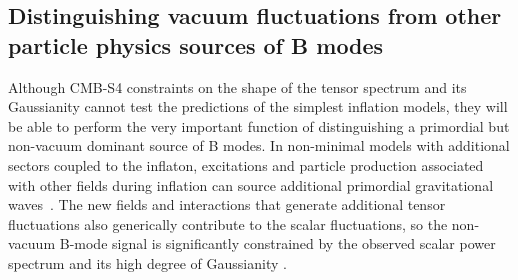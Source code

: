 \subsection{Distinguishing vacuum fluctuations from other particle physics sources of B modes}
\label{subsec:nonvac}
Although CMB-S4 constraints on the shape of the tensor spectrum and its Gaussianity cannot test the predictions of the simplest inflation models, they will be able to perform the very important function of distinguishing a primordial but non-vacuum dominant source of B modes. In non-minimal models with additional sectors coupled to the inflaton, excitations and particle production associated with other fields during inflation can source additional primordial gravitational waves~\cite{Cook:2011hg,Senatore:2011sp,Barnaby:2012xt}. The new fields and interactions that generate additional tensor fluctuations also generically contribute to the scalar fluctuations, so the non-vacuum B-mode signal is significantly constrained by the observed scalar power spectrum and its high degree of Gaussianity \cite{Barnaby:2012xt,Meerburg:2012id,Ferreira:2014zia,Mirbabayi:2014jqa,Ozsoy:2014sba}. 


%


